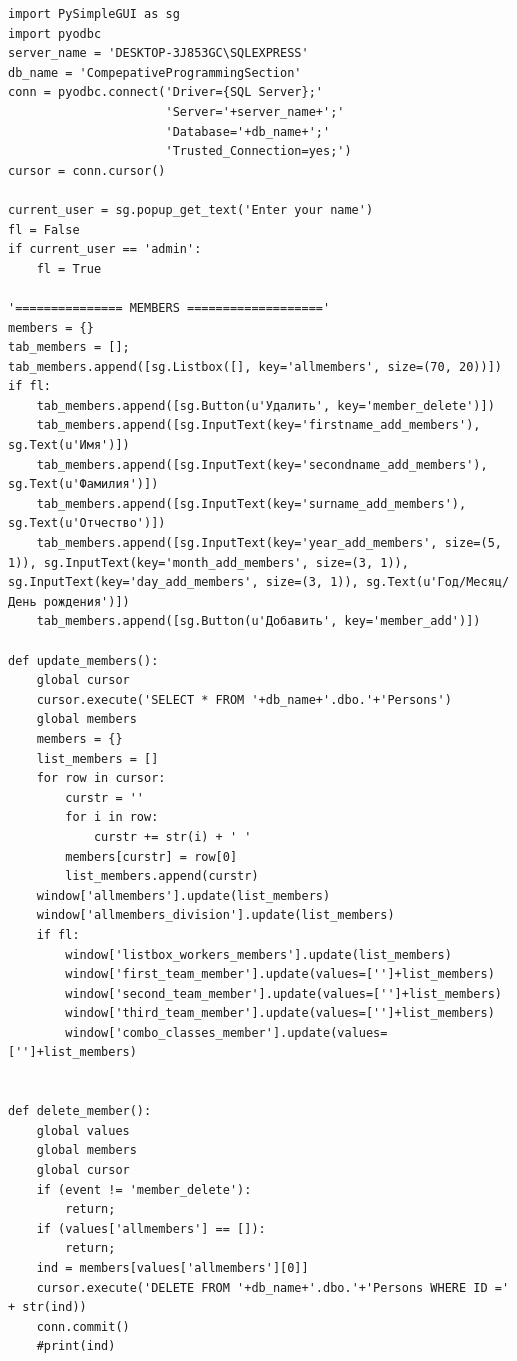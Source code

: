 \documentclass[a4paper,12pt,preview]{report} %
\begin{document}
\begin{verbatim}
import PySimpleGUI as sg
import pyodbc 
server_name = 'DESKTOP-3J853GC\SQLEXPRESS'
db_name = 'CompepativeProgrammingSection'
conn = pyodbc.connect('Driver={SQL Server};'
                      'Server='+server_name+';'
                      'Database='+db_name+';'
                      'Trusted_Connection=yes;')
cursor = conn.cursor()

current_user = sg.popup_get_text('Enter your name')
fl = False
if current_user == 'admin':
    fl = True

'=============== MEMBERS ==================='
members = {}
tab_members = [];
tab_members.append([sg.Listbox([], key='allmembers', size=(70, 20))])
if fl:
    tab_members.append([sg.Button(u'Удалить', key='member_delete')])
    tab_members.append([sg.InputText(key='firstname_add_members'), sg.Text(u'Имя')])
    tab_members.append([sg.InputText(key='secondname_add_members'), sg.Text(u'Фамилия')])
    tab_members.append([sg.InputText(key='surname_add_members'), sg.Text(u'Отчество')])
    tab_members.append([sg.InputText(key='year_add_members', size=(5, 1)), sg.InputText(key='month_add_members', size=(3, 1)), sg.InputText(key='day_add_members', size=(3, 1)), sg.Text(u'Год/Месяц/День рождения')])
    tab_members.append([sg.Button(u'Добавить', key='member_add')])

def update_members():
    global cursor
    cursor.execute('SELECT * FROM '+db_name+'.dbo.'+'Persons')
    global members
    members = {}
    list_members = []
    for row in cursor:
        curstr = ''
        for i in row:
            curstr += str(i) + ' '
        members[curstr] = row[0]
        list_members.append(curstr)
    window['allmembers'].update(list_members)
    window['allmembers_division'].update(list_members)
    if fl:
        window['listbox_workers_members'].update(list_members)
        window['first_team_member'].update(values=['']+list_members)
        window['second_team_member'].update(values=['']+list_members)
        window['third_team_member'].update(values=['']+list_members)
        window['combo_classes_member'].update(values=['']+list_members)
    
    
def delete_member():
    global values
    global members
    global cursor
    if (event != 'member_delete'):
        return;
    if (values['allmembers'] == []):
        return;
    ind = members[values['allmembers'][0]]
    cursor.execute('DELETE FROM '+db_name+'.dbo.'+'Persons WHERE ID =' + str(ind))
    conn.commit()
    #print(ind)


\end{verbatim}
\end{document}
